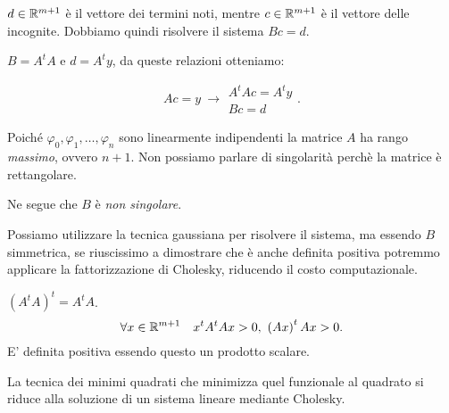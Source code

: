 $d \in \mathbb{R}^{m+1}$ è il vettore dei termini noti, mentre $c \in \mathbb{R}^{m+1}$ è
il vettore delle incognite. Dobbiamo quindi risolvere il sistema $Bc = d$.

\begin{osse}
$B = A^tA$ e $d = A^ty$, da queste relazioni otteniamo:

\[
Ac = y \ \longrightarrow \begin{array}{c}A^tAc = A^ty \\ Bc = d\end{array}.
\]
\end{osse}

Poiché $\varphi_0, \varphi_1, \ldots, \varphi_n$ sono linearmente
indipendenti la matrice $A$ ha rango \emph{massimo}, ovvero $n+1$. Non
possiamo parlare di singolarità perchè la matrice è rettangolare.

Ne segue che $B$ è \emph{non singolare}.

\begin{flushleft}
Possiamo utilizzare la tecnica gaussiana per risolvere il sistema, ma essendo
$B$ simmetrica, se riuscissimo a dimostrare che è anche definita positiva
potremmo applicare la fattorizzazione di Cholesky, riducendo il costo
computazionale.
\end{flushleft}
$\left(A^tA\right)^t = A^tA$.
\[
\forall x \in \mathbb{R}^{m+1} \quad x^tA^tAx > 0, \ \left(Ax\right)^tAx > 0.
\]
E' definita positiva essendo questo un prodotto scalare.

\begin{flushleft}
La tecnica dei minimi quadrati che minimizza quel funzionale al quadrato si
riduce alla soluzione di un sistema lineare mediante Cholesky.
\end{flushleft}

